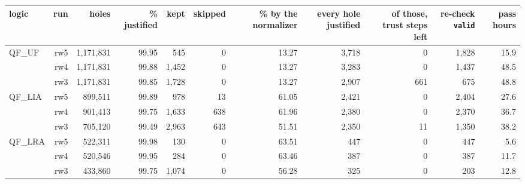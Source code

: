 \begin{tabular}{lrrrrrrrrrr}
\toprule
logic & run & holes & \% justified & kept & skipped & \% by the normalizer & every hole justified & of those, trust steps left & re-check \texttt{valid} & pass hours \\
\midrule
QF\_UF & rw5 & 1,171,831 & 99.95 & 545 & 0 & 13.27 & 3,718 & 0 & 1,828 & 15.9 \\
 & rw4 & 1,171,831 & 99.88 & 1,452 & 0 & 13.27 & 3,283 & 0 & 1,437 & 48.5 \\
 & rw3 & 1,171,831 & 99.85 & 1,728 & 0 & 13.27 & 2,907 & 661 & 675 & 48.8 \\
\midrule
QF\_LIA & rw5 & 899,511 & 99.89 & 978 & 13 & 61.05 & 2,421 & 0 & 2,404 & 27.6 \\
 & rw4 & 901,413 & 99.75 & 1,633 & 638 & 61.96 & 2,380 & 0 & 2,370 & 36.7 \\
 & rw3 & 705,120 & 99.49 & 2,963 & 643 & 51.51 & 2,350 & 11 & 1,350 & 38.2 \\
\midrule
QF\_LRA & rw5 & 522,311 & 99.98 & 130 & 0 & 63.51 & 447 & 0 & 447 & 5.6 \\
 & rw4 & 520,546 & 99.95 & 284 & 0 & 63.46 & 387 & 0 & 387 & 11.7 \\
 & rw3 & 433,860 & 99.75 & 1,074 & 0 & 56.28 & 325 & 0 & 203 & 12.8 \\
\bottomrule
\end{tabular}
